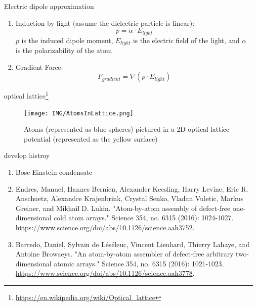 \documentclass[18 pt]{beamer}
\begin{document}
\begin{frame}{Electric dipole approximation}
  \begin{enumerate}
    \item Induction by light (assume the dielectric particle is linear):
    \[p = \alpha \cdot E_{light}\]
    $p$ is the induced dipole moment, $E_{light}$ is the electric field of the light, and \(\alpha\) is the polarizability of the atom
    \item Gradient Force:
    \[F_{gradient} = \nabla (p \cdot E_{light})\]
  \end{enumerate}
\end{frame}
\begin{frame}{optical lattice\footnote{\url{https://en.wikipedia.org/wiki/Optical_lattice}}}
  \begin{figure}
    \texttt{[image: IMG/AtomsInLattice.png]}
    \caption{Atoms (represented as blue spheres) pictured in a 2D-optical lattice potential (represented as the yellow surface)}
  \end{figure}
\end{frame}
\begin{frame}{develop histroy}
  \begin{enumerate}
    \item Bose-Einstein condensate
    \item \small{Endres, Manuel, Hannes Bernien, Alexander Keesling, Harry Levine, Eric R. Anschuetz, Alexandre Krajenbrink, Crystal Senko, Vladan Vuletic, Markus Greiner, and Mikhail D. Lukin. "Atom-by-atom assembly of defect-free one-dimensional cold atom arrays." Science 354, no. 6315 (2016): 1024-1027. \url{https://www.science.org/doi/abs/10.1126/science.aah3752}.}
    \item \small{Barredo, Daniel, Sylvain de Léséleuc, Vincent Lienhard, Thierry Lahaye, and Antoine Browaeys. "An atom-by-atom assembler of defect-free arbitrary two-dimensional atomic arrays." Science 354, no. 6315 (2016): 1021-1023. \url{https://www.science.org/doi/abs/10.1126/science.aah3778}.}
  \end{enumerate}
\end{frame}
\end{document}
